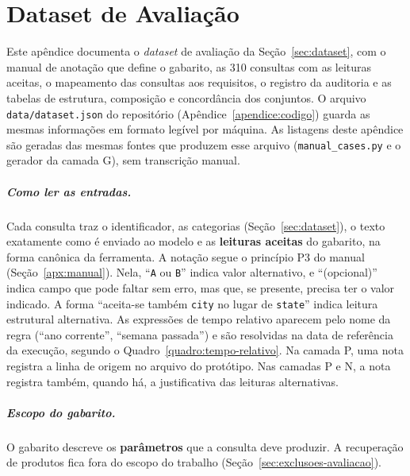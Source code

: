 \chapter{Dataset de Avaliação}
\label{apendice:dataset}

Este apêndice documenta o \textit{dataset} de avaliação da Seção~\ref{sec:dataset}, com o manual de anotação que define o gabarito, as 310 consultas com as leituras aceitas, o mapeamento das consultas aos requisitos, o registro da auditoria e as tabelas de estrutura, composição e concordância dos conjuntos. O arquivo \texttt{data/dataset.json} do repositório (Apêndice~\ref{apendice:codigo}) guarda as mesmas informações em formato legível por máquina. As listagens deste apêndice são geradas das mesmas fontes que produzem esse arquivo (\texttt{manual\_cases.py} e o gerador da camada G), sem transcrição manual.

\paragraph{Como ler as entradas.} Cada consulta traz o identificador, as categorias (Seção~\ref{sec:dataset}), o texto exatamente como é enviado ao modelo e as \textbf{leituras aceitas} do gabarito, na forma canônica da ferramenta. A notação segue o princípio P3 do manual (Seção~\ref{apx:manual}). Nela, ``\texttt{A} ou \texttt{B}'' indica valor alternativo, e ``(opcional)'' indica campo que pode faltar sem erro, mas que, se presente, precisa ter o valor indicado. A forma ``aceita-se também \texttt{city} no lugar de \texttt{state}'' indica leitura estrutural alternativa. As expressões de tempo relativo aparecem pelo nome da regra (``ano corrente'', ``semana passada'') e são resolvidas na data de referência da execução, segundo o Quadro~\ref{quadro:tempo-relativo}. Na camada P, uma nota registra a linha de origem no arquivo do protótipo. Nas camadas P e N, a nota registra também, quando há, a justificativa das leituras alternativas.

\paragraph{Escopo do gabarito.} O gabarito descreve os \textbf{parâmetros} que a consulta deve produzir. A recuperação de produtos fica fora do escopo do trabalho (Seção~\ref{sec:exclusoes-avaliacao}).

